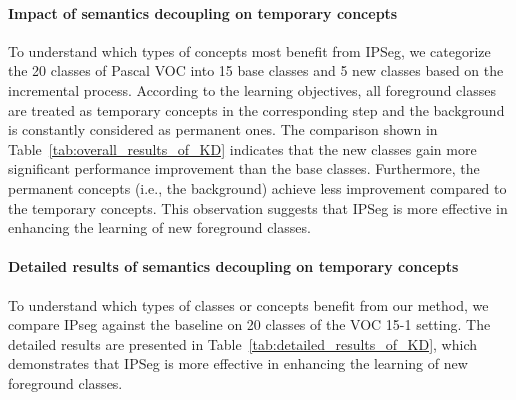 \paragraph{Impact of semantics decoupling on temporary concepts} To understand which types of concepts most benefit from IPSeg, we categorize the 20 classes of Pascal VOC into 15 base classes and 5 new classes based on the incremental process. According to the learning objectives, all foreground classes are treated as temporary concepts in the corresponding step and the background is constantly considered as permanent ones.
The comparison shown in Table~\ref{tab:overall_results_of_KD} indicates that the new classes gain more significant performance improvement than the base classes. Furthermore, the permanent concepts (i.e., the background) achieve less improvement compared to the temporary concepts. This observation suggests that IPSeg is more effective in enhancing the learning of new foreground classes.

\begin{table}[h]
    \caption{The ablation study of \textbf{SD} over background (BG), base foreground classes (Base) and new foreground classes (New) on Pascal VOC 15-1 with Swin-B backbone.}
    \centering
    \label{tab:overall_results_of_KD}
\end{table}


\paragraph{Detailed results of semantics decoupling on temporary concepts} To understand which types of classes or concepts benefit from our method, we compare IPseg against the baseline on 20 classes of the VOC 15-1 setting. The detailed results are presented in Table~\ref{tab:detailed_results_of_KD}, which demonstrates that IPSeg is more effective in enhancing the learning of new foreground classes.

